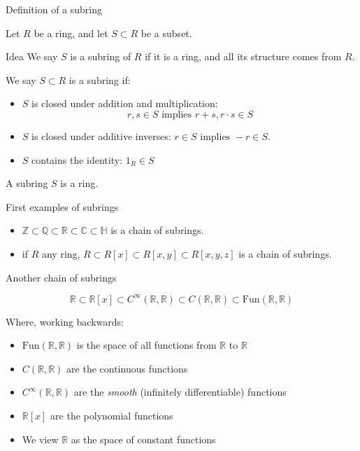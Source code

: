 \documentclass{beamer}
\begin{document}
\begin{frame}{Definition of a subring}

  Let $R$ be a ring, and let $S\subset R$ be a subset.
  
  \begin{block}{Idea}
    We say $S$ is a subring of $R$ if it is a ring, and all its structure comes from $R$.
  \end{block}

  \begin{definition}
We say $S\subset R$ is a subring if:
    \begin{itemize}
\item $S$ is closed under addition and multiplication:
$$r,s\in S \text{ implies } r+s, r\cdot s\in S$$
\item $S$ is closed under additive inverses: $r\in S \text{ implies } -r\in S$.
\item $S$ contains the identity: $1_R\in S$
\end{itemize}
\end{definition}

  \begin{lemma} A subring $S$ is a ring.
    \end{lemma}
  

\end{frame}


\begin{frame}{First examples of subrings}

\begin{itemize}
\item $\mathbb{Z}\subset\mathbb{Q}\subset \mathbb{R}\subset\mathbb{C}\subset\mathbb{H}$ is a chain of subrings.
\item if $R$ any ring, $R\subset R[x]\subset R[x,y]\subset R[x,y,z]$ is a chain of subrings.
\end{itemize}
\end{frame}

\begin{frame}{Another chain of subrings}

$$\mathbb{R}\subset \mathbb{R}[x]\subset C^\infty(\mathbb{R},\mathbb{R})\subset C(\mathbb{R},\mathbb{R}) \subset \textrm{Fun}(\mathbb{R},\mathbb{R})$$

Where, working backwards:
\begin{itemize}
\item $\textrm{Fun}(\mathbb{R},\mathbb{R})$ is the space of all functions from $\mathbb{R}$ to $\mathbb{R}$
\item $C(\mathbb{R},\mathbb{R})$ are the continuous functions
\item $C^\infty(\mathbb{R},\mathbb{R})$ are the \emph{smooth} (infinitely differentiable) functions
\item $\mathbb{R}[x]$ are the polynomial functions
\item We view $\mathbb{R}$ as the space of constant functions 
\end{itemize}

\end{frame}
\end{document}
